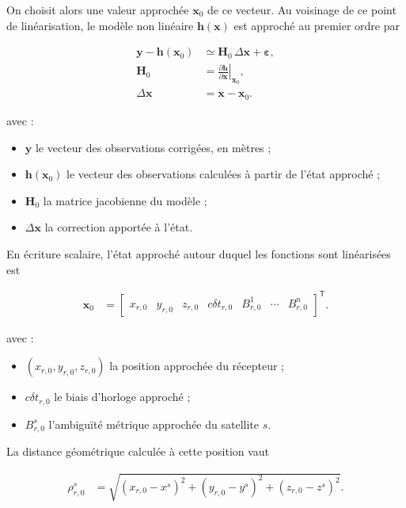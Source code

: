 On choisit alors une valeur approchée $\mathbf x_0$ de ce vecteur. Au voisinage
de ce point de linéarisation, le modèle non linéaire
$\mathbf h(\mathbf x)$ est approché au premier ordre par

\begin{align}
\mathbf y-\mathbf h(\mathbf x_0)
&\simeq
\mathbf H_0\,\Delta\mathbf x+\boldsymbol\varepsilon,
\\
\mathbf H_0
&=
\left.
\frac{\partial\mathbf h}{\partial\mathbf x}
\right|_{\mathbf x_0},
\\
\Delta\mathbf x
&=
\mathbf x-\mathbf x_0.
\label{ann:eq:linearized_model}
\end{align}

avec :

\begin{itemize}
    \item $\mathbf y$ le vecteur des observations corrigées, en mètres ;
    \item $\mathbf h(\mathbf x_0)$ le vecteur des observations calculées à
    partir de l'état approché ;
    \item $\mathbf H_0$ la matrice jacobienne du modèle ;
    \item $\Delta\mathbf x$ la correction apportée à l'état.
\end{itemize}

En écriture scalaire, l'état approché autour duquel les fonctions sont
linéarisées est

\begin{align}
\mathbf x_0
&=
\begin{bmatrix}
x_{r,0} & y_{r,0} & z_{r,0} & c\delta t_{r,0} &
B_{r,0}^{1} & \cdots & B_{r,0}^{n}
\end{bmatrix}^{\mathsf T}.
\label{ann:eq:approximate_state}
\end{align}

avec :

\begin{itemize}
    \item $(x_{r,0},y_{r,0},z_{r,0})$ la position approchée du récepteur ;
    \item $c\delta t_{r,0}$ le biais d'horloge approché ;
    \item $B_{r,0}^{s}$ l'ambiguïté métrique approchée du satellite $s$.
\end{itemize}

La distance géométrique calculée à cette position vaut

\begin{align}
\rho_{r,0}^s
&=
\sqrt{(x_{r,0}-x^s)^2+(y_{r,0}-y^s)^2+(z_{r,0}-z^s)^2}.
\label{ann:eq:geometric_range_at_initial_state}
\end{align}

